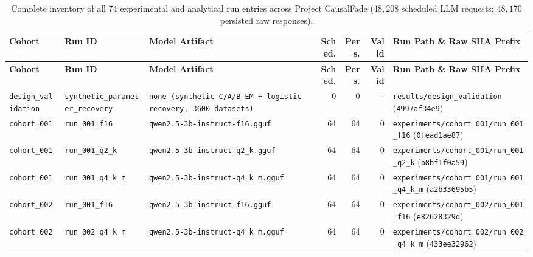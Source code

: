 {\scriptsize
\setlength{\tabcolsep}{3pt}
\begin{longtable}{@{}>{\raggedright\arraybackslash}p{1.5cm}>{\raggedright\arraybackslash}p{2.7cm}>{\raggedright\arraybackslash}p{3.2cm}rrr>{\raggedright\arraybackslash}p{4.2cm}@{}}
\caption{Complete inventory of all 74 experimental and analytical run entries across Project CausalFade ($48{,}208$ scheduled LLM requests; $48{,}170$ persisted raw responses).}\label{tab:experiment_runs}\\
\toprule
\textbf{Cohort} & \textbf{Run ID} & \textbf{Model Artifact} & \textbf{Sched.} & \textbf{Pers.} & \textbf{Valid} & \textbf{Run Path \& Raw SHA Prefix} \\
\midrule
\endfirsthead
\toprule
\textbf{Cohort} & \textbf{Run ID} & \textbf{Model Artifact} & \textbf{Sched.} & \textbf{Pers.} & \textbf{Valid} & \textbf{Run Path \& Raw SHA Prefix} \\
\midrule
\endhead
\bottomrule
\endfoot
\texttt{design\_validation} & \texttt{synthetic\_parameter\_recovery} & \texttt{none (synthetic C/\allowbreak{}A/\allowbreak{}B EM + logistic recovery, 3600 datasets)} & 0 & 0 & -\allowbreak{}-\allowbreak{} & \texttt{results/\allowbreak{}design\_validation} (\texttt{4997af34e9}) \\
\texttt{cohort\_001} & \texttt{run\_001\_f16} & \texttt{qwen2.5-\allowbreak{}3b-\allowbreak{}instruct-\allowbreak{}f16.gguf} & 64 & 64 & 0 & \texttt{experiments/\allowbreak{}cohort\_001/\allowbreak{}run\_001\_f16} (\texttt{0fead1ae87}) \\
\texttt{cohort\_001} & \texttt{run\_001\_q2\_k} & \texttt{qwen2.5-\allowbreak{}3b-\allowbreak{}instruct-\allowbreak{}q2\_k.gguf} & 64 & 64 & 0 & \texttt{experiments/\allowbreak{}cohort\_001/\allowbreak{}run\_001\_q2\_k} (\texttt{b8bf1f0a59}) \\
\texttt{cohort\_001} & \texttt{run\_001\_q4\_k\_m} & \texttt{qwen2.5-\allowbreak{}3b-\allowbreak{}instruct-\allowbreak{}q4\_k\_m.gguf} & 64 & 64 & 0 & \texttt{experiments/\allowbreak{}cohort\_001/\allowbreak{}run\_001\_q4\_k\_m} (\texttt{a2b33695b5}) \\
\texttt{cohort\_002} & \texttt{run\_001\_f16} & \texttt{qwen2.5-\allowbreak{}3b-\allowbreak{}instruct-\allowbreak{}f16.gguf} & 64 & 64 & 0 & \texttt{experiments/\allowbreak{}cohort\_002/\allowbreak{}run\_001\_f16} (\texttt{e82628329d}) \\
\texttt{cohort\_002} & \texttt{run\_002\_q4\_k\_m} & \texttt{qwen2.5-\allowbreak{}3b-\allowbreak{}instruct-\allowbreak{}q4\_k\_m.gguf} & 64 & 64 & 0 & \texttt{experiments/\allowbreak{}cohort\_002/\allowbreak{}run\_002\_q4\_k\_m} (\texttt{433ee32962}) \\

\end{longtable}}
